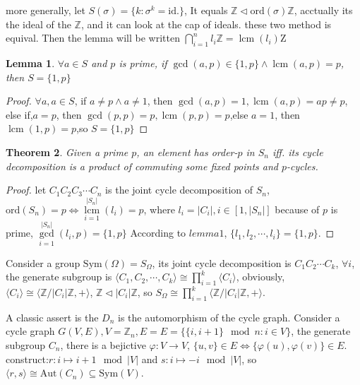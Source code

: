 \documentclass[10pt,a4paper]{article}
\newtheorem{theorem}{Theorem}[section]
\newtheorem{lemma}[theorem]{Lemma}
\begin{document}
more generally, let $S(\sigma)=\{k:\sigma^k=\mathrm{id.}\}$, It equals $\mathbb{Z}\triangleleft\mathrm{ord}(\sigma)\mathbb{Z}$,
acctually its the ideal of the $\mathbb{Z}$, and it can look at the cap of ideals. these two method is equival.
Then the lemma will be written $\bigcap\limits_{i=1}^{n}l_i\mathbb{Z}=\operatorname{lcm}(l_i)\mathrm{Z}$

\begin{lemma}
    $\forall a\in S$ and $p$ is prime, if $\gcd(a,p)\in\{1,p\}\land\operatorname{lcm}(a,p)=p$, then $S=\{1,p\}$
\end{lemma}

\begin{proof}
    $\forall a,a\in S$, if $a\ne p\land a\ne 1$, then $\gcd(a,p)=1,\operatorname{lcm}(a,p)=ap\ne p$,
    else if,$a=p$, then $\gcd(p,p)=p,\operatorname{lcm}(p,p)=p$,else $a=1$, then $\operatorname{lcm}(1,p)=p$,so $S=\{1,p\}$
\end{proof}

\begin{theorem}
    Given a prime $p$, an element has order-$p$ in $S_n$ iff. its cycle decomposition is a product of commuting some fixed points and $p$-cycles.
\end{theorem}

\begin{proof}
    let $C_1C_2C_3\cdots C_n$ is the joint cycle decomposition of $S_n$, 
    $\mathrm{ord}(S_n)=p\iff\operatorname{lcm}\limits_{i=1}^{|S_n|}(l_i)=p$, where $l_i=|C_i|,i\in[1,|S_n|]$
    because of $p$ is prime, $\gcd\limits_{i=1}^{|S_n|}(l_i,p)=\{1,p\}$
    According to $lemma 1$, $\{l_1,l_2,\cdots,l_i\}=\{1,p\}$.
\end{proof} 
 
Consider a group $\mathrm{Sym}(\Omega)=S_\Omega$, its joint cycle decomposition is 
$C_1C_2\cdots C_k$, $\forall i$, the generate subgroup is
$\langle C_1,C_2,\cdots,C_k\rangle\cong\prod\limits_{i=1}^{k}\langle C_i\rangle$, obviously,
$\langle C_i\rangle\cong\langle\mathbb{Z}/|C_i|\mathbb{Z},+\rangle$, $\mathbb{Z}\triangleleft|C_i|\mathbb{Z}$,
so $S_{\Omega}\cong\prod\limits_{i=1}^{k}\langle\mathbb{Z}/|C_i|\mathbb{Z},+\rangle$.

A classic assert is the $D_n$ is the automorphism of the cycle graph. Consider a cycle graph $G(V,E),V=\mathbb{Z}_n,E=E=\{\{i,i+1\}\mod n:i\in V\}$, the generate subgroup $C_n$, 
there is a bejictive $\varphi:V\to V$, $\{u,v\}\in E\iff\{\varphi(u),\varphi(v)\}\in E$.
construct:$r:i\mapsto i+1\mod|V|$ and $s:i\mapsto -i\mod|V|$, so $\langle r,s\rangle\cong\mathrm{Aut}(C_n)\subseteq\mathrm{Sym}(V)$.
\end{document}
